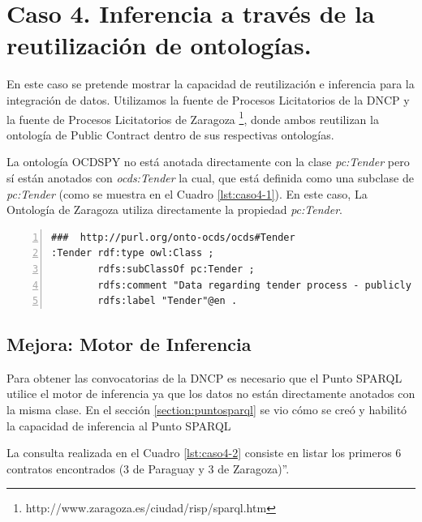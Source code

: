 \section{Caso 4. Inferencia a través de la reutilización de ontologías. }
\label{section:caso4}

En este caso se pretende mostrar la capacidad de reutilización e inferencia para la integración de datos. Utilizamos la fuente de Procesos Licitatorios de la DNCP y la fuente de Procesos Licitatorios de Zaragoza \footnote{http://www.zaragoza.es/ciudad/risp/sparql.htm}, donde ambos reutilizan la ontología de Public Contract dentro de sus respectivas ontologías. 

La ontología OCDSPY no está anotada directamente con la clase \textit{pc:Tender} pero sí están anotados con \textit{ocds:Tender} la cual, que está definida como una subclase de \textit{pc:Tender} (como se muestra en el Cuadro \ref{lst:caso4-1}). En este caso, La Ontología de Zaragoza utiliza directamente la propiedad \textit{pc:Tender}.

\noindent\begin{minipage}[c]{\textwidth}
\begin{lstlisting}[captionpos=b, caption=Extensión de la ontología reutilizando PC, label={lst:caso4-1},  numbers=left,  numberstyle=\tiny\color{mygray},frame=single]
###  http://purl.org/onto-ocds/ocds#Tender
:Tender rdf:type owl:Class ;
        rdfs:subClassOf pc:Tender ;
        rdfs:comment "Data regarding tender process - publicly inviting prospective contractors to submit bids for evaluation and selecting a winner or winners"@en ;
        rdfs:label "Tender"@en .
 \end{lstlisting}
\end{minipage}

\subsection{Mejora: Motor de Inferencia}
Para obtener las convocatorias de la DNCP es necesario que el Punto SPARQL utilice el motor de inferencia ya que los datos no están directamente anotados con la misma clase. En el sección \ref{section:puntosparql} se vio cómo se creó y habilitó la capacidad de inferencia al Punto SPARQL\hfill \break

La consulta realizada en el Cuadro \ref{lst:caso4-2} consiste en listar los primeros 6 contratos encontrados (3 de Paraguay y 3 de Zaragoza)”.\hfill \break
 
